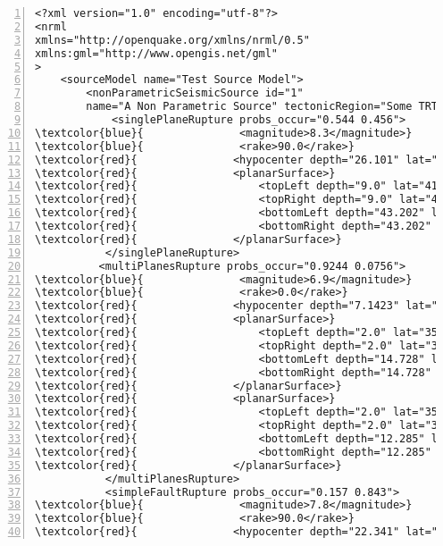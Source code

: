 \begin{Verbatim}[frame=single, commandchars=\\\{\}, fontsize=\footnotesize,
    numbers=left, numbersep=2pt]
<?xml version="1.0" encoding="utf-8"?>
<nrml
xmlns="http://openquake.org/xmlns/nrml/0.5"
xmlns:gml="http://www.opengis.net/gml"
>
    <sourceModel name="Test Source Model">
        <nonParametricSeismicSource id="1"
        name="A Non Parametric Source" tectonicRegion="Some TRT">
            <singlePlaneRupture probs_occur="0.544 0.456">
\textcolor{blue}{               <magnitude>8.3</magnitude>}
\textcolor{blue}{               <rake>90.0</rake>}
\textcolor{red}{               <hypocenter depth="26.101" lat="40.726" lon="143.0"/>}
\textcolor{red}{               <planarSurface>}
\textcolor{red}{                   <topLeft depth="9.0" lat="41.6" lon="143.1"/>}
\textcolor{red}{                   <topRight depth="9.0" lat="40.2" lon="143.91"/>}
\textcolor{red}{                   <bottomLeft depth="43.202" lat="41.252" lon="142.07"/>}
\textcolor{red}{                   <bottomRight depth="43.202" lat="39.852" lon="142.91"/>}
\textcolor{red}{               </planarSurface>}
           </singlePlaneRupture>
          <multiPlanesRupture probs_occur="0.9244 0.0756">
\textcolor{blue}{               <magnitude>6.9</magnitude>}
\textcolor{blue}{               <rake>0.0</rake>}
\textcolor{red}{               <hypocenter depth="7.1423" lat="35.296" lon="139.31"/>}
\textcolor{red}{               <planarSurface>}
\textcolor{red}{                   <topLeft depth="2.0" lat="35.363" lon="139.16"/>}
\textcolor{red}{                   <topRight depth="2.0" lat="35.394" lon="138.99"/>}
\textcolor{red}{                   <bottomLeft depth="14.728" lat="35.475" lon="139.19"/>}
\textcolor{red}{                   <bottomRight depth="14.728" lat="35.505" lon="139.02"/>}
\textcolor{red}{               </planarSurface>}
\textcolor{red}{               <planarSurface>}
\textcolor{red}{                   <topLeft depth="2.0" lat="35.169" lon="139.34"/>}
\textcolor{red}{                   <topRight depth="2.0" lat="35.358" lon="139.17"/>}
\textcolor{red}{                   <bottomLeft depth="12.285" lat="35.234" lon="139.45"/>}
\textcolor{red}{                   <bottomRight depth="12.285" lat="35.423" lon="139.28"/>}
\textcolor{red}{               </planarSurface>}
           </multiPlanesRupture>
           <simpleFaultRupture probs_occur="0.157 0.843">
\textcolor{blue}{               <magnitude>7.8</magnitude>}
\textcolor{blue}{               <rake>90.0</rake>}
\textcolor{red}{               <hypocenter depth="22.341" lat="43.624" lon="147.94"/>}

\end{Verbatim}
